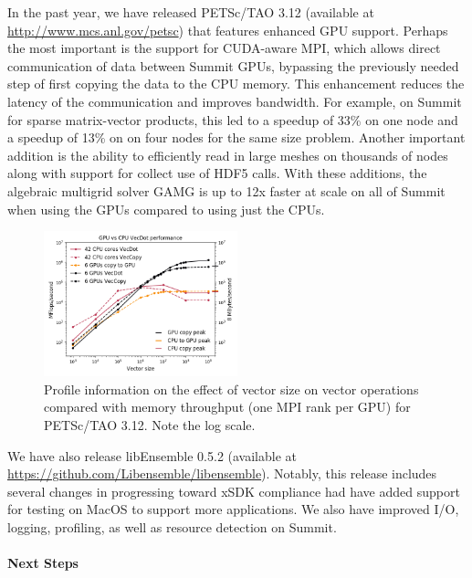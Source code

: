 In the past year, we have released PETSc/TAO 3.12 (available at \url{http://www.mcs.anl.gov/petsc})
that features enhanced GPU support.  Perhaps the most important is the support for CUDA-aware 
MPI, which allows direct communication of data between Summit GPUs, bypassing the previously 
needed step of first copying the data to the CPU memory. This enhancement reduces the latency 
of the communication and improves bandwidth. For example, on Summit for sparse matrix-vector 
products, this led to a speedup of 33\% on one node and a speedup of 13\% on on four nodes 
for the same size problem. Another important addition is the ability to efficiently read 
in large meshes on thousands of nodes along with support for collect use of HDF5 calls. 
With these additions, the algebraic multigrid solver GAMG is up to 12x faster at scale 
on all of Summit when using the GPUs compared to using just the CPUs.

\begin{figure}
\centering
\includegraphics[width=0.5\textwidth]{projects/2.3.3-MathLibs/2.3.3.06-PETSc-TAO/petsc_profile}
\caption{Profile information on the effect of vector size on vector operations compared with 
memory throughput (one MPI rank per GPU) for PETSc/TAO 3.12. Note the log scale.}
\label{fig:petsc-tao-fig}
\end{figure}

We have also release libEnsemble 0.5.2 (available at \url{https://github.com/Libensemble/libensemble}).
Notably, this release includes several changes in progressing toward xSDK compliance had have added
support for testing on MacOS to support more applications.  We also have improved I/O, logging, 
profiling, as well as resource detection on Summit.

\paragraph{Next Steps}

